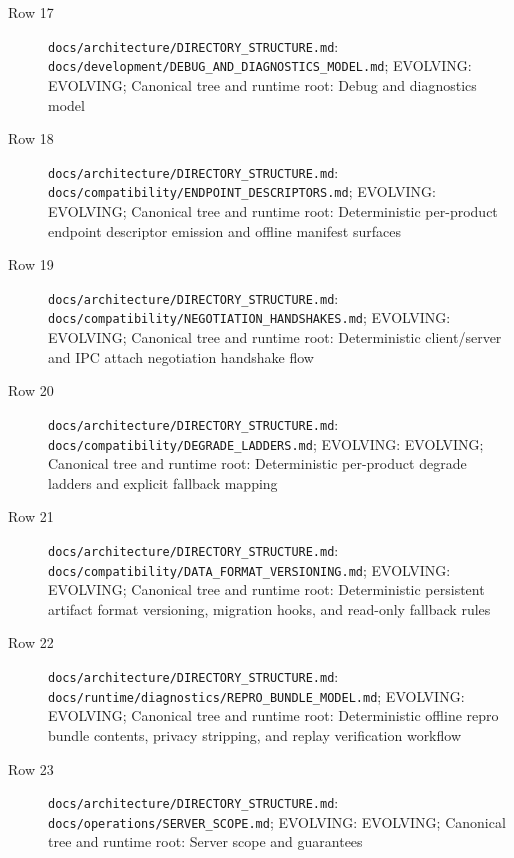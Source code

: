 \documentclass[9pt,a4paper,openany]{book}
\begin{document}
\begin{description}
\item[Row 17] \texttt{docs/\allowbreak{}architecture/\allowbreak{}DIRECTORY\_\allowbreak{}STRUCTURE.\allowbreak{}md}: \texttt{docs/\allowbreak{}development/\allowbreak{}DEBUG\_\allowbreak{}AND\_\allowbreak{}DIAGNOSTICS\_\allowbreak{}MODEL.\allowbreak{}md}; EVOLVING: EVOLVING; Canonical tree and runtime root: Debug and diagnostics model
\item[Row 18] \texttt{docs/\allowbreak{}architecture/\allowbreak{}DIRECTORY\_\allowbreak{}STRUCTURE.\allowbreak{}md}: \texttt{docs/\allowbreak{}compatibility/\allowbreak{}ENDPOINT\_\allowbreak{}DESCRIPTORS.\allowbreak{}md}; EVOLVING: EVOLVING; Canonical tree and runtime root: Deterministic per-\allowbreak{}product endpoint descriptor emission and offline manifest surfaces
\item[Row 19] \texttt{docs/\allowbreak{}architecture/\allowbreak{}DIRECTORY\_\allowbreak{}STRUCTURE.\allowbreak{}md}: \texttt{docs/\allowbreak{}compatibility/\allowbreak{}NEGOTIATION\_\allowbreak{}HANDSHAKES.\allowbreak{}md}; EVOLVING: EVOLVING; Canonical tree and runtime root: Deterministic client/\allowbreak{}server and IPC attach negotiation handshake flow
\item[Row 20] \texttt{docs/\allowbreak{}architecture/\allowbreak{}DIRECTORY\_\allowbreak{}STRUCTURE.\allowbreak{}md}: \texttt{docs/\allowbreak{}compatibility/\allowbreak{}DEGRADE\_\allowbreak{}LADDERS.\allowbreak{}md}; EVOLVING: EVOLVING; Canonical tree and runtime root: Deterministic per-\allowbreak{}product degrade ladders and explicit fallback mapping
\item[Row 21] \texttt{docs/\allowbreak{}architecture/\allowbreak{}DIRECTORY\_\allowbreak{}STRUCTURE.\allowbreak{}md}: \texttt{docs/\allowbreak{}compatibility/\allowbreak{}DATA\_\allowbreak{}FORMAT\_\allowbreak{}VERSIONING.\allowbreak{}md}; EVOLVING: EVOLVING; Canonical tree and runtime root: Deterministic persistent artifact format versioning, migration hooks, and read-\allowbreak{}only fallback rules
\item[Row 22] \texttt{docs/\allowbreak{}architecture/\allowbreak{}DIRECTORY\_\allowbreak{}STRUCTURE.\allowbreak{}md}: \texttt{docs/\allowbreak{}runtime/\allowbreak{}diagnostics/\allowbreak{}REPRO\_\allowbreak{}BUNDLE\_\allowbreak{}MODEL.\allowbreak{}md}; EVOLVING: EVOLVING; Canonical tree and runtime root: Deterministic offline repro bundle contents, privacy stripping, and replay verification workflow
\item[Row 23] \texttt{docs/\allowbreak{}architecture/\allowbreak{}DIRECTORY\_\allowbreak{}STRUCTURE.\allowbreak{}md}: \texttt{docs/\allowbreak{}operations/\allowbreak{}SERVER\_\allowbreak{}SCOPE.\allowbreak{}md}; EVOLVING: EVOLVING; Canonical tree and runtime root: Server scope and guarantees

\end{description}
\end{document}
